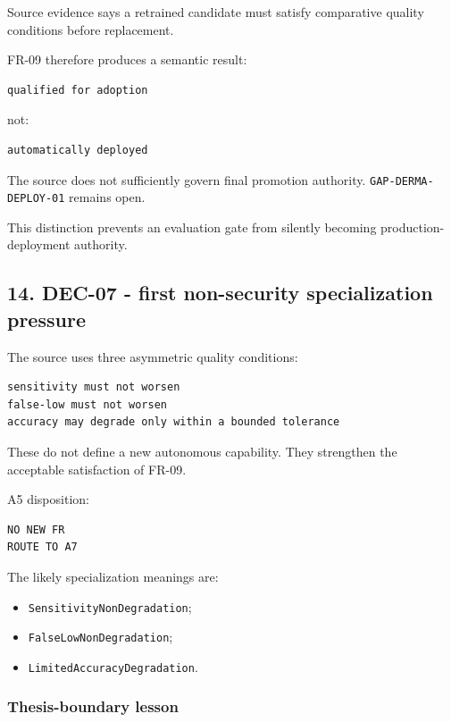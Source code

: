 \documentclass[11pt,a4paper]{article}
\providecommand{\tightlist}{\setlength{\itemsep}{0pt}\setlength{\parskip}{0pt}}
\begin{document}
Source evidence says a retrained candidate must satisfy comparative
quality conditions before replacement.

FR-09 therefore produces a semantic result:

\begin{verbatim}
qualified for adoption
\end{verbatim}

not:

\begin{verbatim}
automatically deployed
\end{verbatim}

The source does not sufficiently govern final promotion authority.
\texttt{GAP-DERMA-DEPLOY-01} remains open.

This distinction prevents an evaluation gate from silently becoming
production-deployment authority.

\subsection{14. DEC-07 - first non-security specialization
pressure}\label{14-dec-07---first-non-security-specialization-pressure}

The source uses three asymmetric quality conditions:

\begin{verbatim}
sensitivity must not worsen
false-low must not worsen
accuracy may degrade only within a bounded tolerance
\end{verbatim}

These do not define a new autonomous capability. They strengthen the
acceptable satisfaction of FR-09.

A5 disposition:

\begin{verbatim}
NO NEW FR
ROUTE TO A7
\end{verbatim}

The likely specialization meanings are:

\begin{itemize}
\tightlist
\item
  \texttt{SensitivityNonDegradation};
\item
  \texttt{FalseLowNonDegradation};
\item
  \texttt{LimitedAccuracyDegradation}.
\end{itemize}

\subsubsection{Thesis-boundary lesson}\label{thesis-boundary-lesson}
\end{document}
